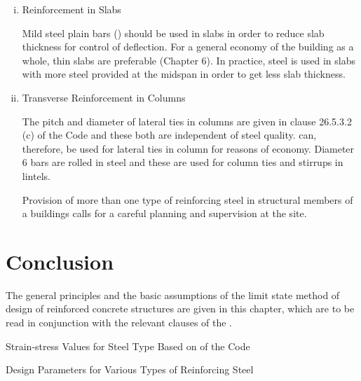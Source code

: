 \begin{enumerate}[(i)]
\item Reinforcement in Slabs

Mild steel plain bars (\fetwofivezero) should be used in slabs in order
to reduce slab thickness for control of deflection. For a general
economy of the building as a whole, thin slabs are preferable
(Chapter 6). In practice, {\fefouronefive} steel is used in slabs with
more steel provided at the midspan in order to get less slab thickness.

\item Transverse Reinforcement in Columns

The pitch and diameter of lateral ties in columns are given in clause
26.5.3.2 (c) of the Code and these both are independent of steel quality.
{\fetwofivezero} can, therefore, be used for lateral ties in column for
reasons of economy. Diameter 6 \mm bars are rolled in {\fetwofivezero}
steel and these are used for column ties and stirrups in lintels.


Provision of more than one type of reinforcing steel in structural
members of a buildings calls for a careful planning and supervision at
the site.
\end{enumerate}

\section{Conclusion}
The general principles and the basic assumptions of the limit state
method of design of reinforced concrete structures are given in this
chapter, which are to be read in conjunction with the relevant clauses
of the .

\begin{table}
\centering
\caption{Strain-stress Values for Steel Type {\fefouronefive} Based on
 of the Code}
\label{stress-strain-values-table}
\end{table}
\begin{table}
\centering
{}
\caption{Design Parameters for Various Types of Reinforcing Steel}
\label{reinforcing-steel-table}
\end{table}
